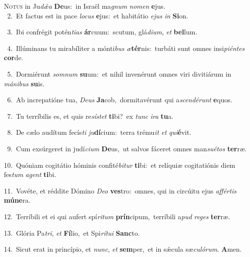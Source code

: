 \lettrine{\initial\textcolor{\initialcolor}{N}}{otus} in Ju\-\textit{dǽ}\-\textit{a} \textbf{De}\-us:~\star in Israël ma\textit{gnum} \textit{no}\-\textit{men} \textbf{e}\-jus.\\
{\numbfont\textcolor{\numbcolor}{~2.}}~Et factus est in pace \textit{lo}\-\textit{cus} \textbf{e}\-jus:~\star et habitátio \textit{e}\-\textit{jus} \textit{in} \textbf{Si}\-on.\par
{\numbfont\textcolor{\numbcolor}{~3.}}~Ibi confrégit potén\-\textit{ti}\-\textit{as} \textbf{ár}\-cuum:~\star scutum, glá\-\textit{di}\-\textit{um}, \textit{et} \textbf{bel}\-lum.\par
{\numbfont\textcolor{\numbcolor}{~4.}}~Illúminans tu mirabíliter a mónti\textit{bus} \textit{æ}\-\textbf{tér}nis:~\star turbáti sunt omnes insi\-\textit{pi}\-\textit{én}\textit{tes} \textbf{cor}\-de.\par
{\numbfont\textcolor{\numbcolor}{~5.}}~Dormiérunt \textit{som}\-\textit{num} \textbf{su}\-um:~\star et nihil invenérunt omnes viri divitiárum in \textit{má}\-\textit{ni}\textit{bus} \textbf{su}\-is.\par
{\numbfont\textcolor{\numbcolor}{~6.}}~Ab increpatióne tua, \textit{De}\-\textit{us} \textbf{Ja}\-cob,~\star dormitavérunt qui a\-\textit{scen}\-\textit{dé}\textit{runt} \textbf{e}\-quos.\par
{\numbfont\textcolor{\numbcolor}{~7.}}~Tu terríbilis es, et quis re\-\textit{sís}\-\textit{tet} \textbf{ti}\-bi?~\star ex \textit{tunc} \textit{i}\-\textit{ra} \textbf{tu}\-a.\par
{\numbfont\textcolor{\numbcolor}{~8.}}~De cælo audítum fecís\textit{ti} \textit{ju}\-\textbf{dí}cium:~\star terra trému\textit{it} \textit{et} \textit{qui}\-\textbf{é}vit.\par
{\numbfont\textcolor{\numbcolor}{~9.}}~Cum exsúrgeret in judí\-\textit{ci}\-\textit{um} \textbf{De}\-us,~\star ut salvos fáceret omnes man\-\textit{su}\-\textit{é}\textit{tos} \textbf{ter}\-ræ.\par
{\numbfont\textcolor{\numbcolor}{10.}}~Quóniam cogitátio hóminis confité\-\textit{bi}\-\textit{tur} \textbf{ti}\-bi:~\star et relíquiæ cogitatiónis diem fes\textit{tum} \textit{a}\-\textit{gent} \textbf{ti}\-bi.\par
{\numbfont\textcolor{\numbcolor}{11.}}~Vovéte, et réddite Dómino \textit{De}\-\textit{o} \textbf{ves}\-tro:~\star omnes, qui in circúitu ejus \textit{af}\-\textit{fér}\textit{tis} \textbf{mú}\-\textbf{ne}ra.\par
{\numbfont\textcolor{\numbcolor}{12.}}~Terríbili et ei qui aufert spí\-\textit{ri}\-\textit{tum} \textbf{prín}\-cipum,~\star terríbili a\textit{pud} \textit{re}\-\textit{ges} \textbf{ter}\-ræ.\par
{\numbfont\textcolor{\numbcolor}{13.}}~Glória Pa\-\textit{tri}\-, \textit{et} \textbf{Fí}\-lio,~\star et Spi\-\textit{rí}\-\textit{tu}\textit{i} \textbf{Sanc}\-to.\par
{\numbfont\textcolor{\numbcolor}{14.}}~Sicut erat in princípio, et \textit{nunc}\-, \textit{et} \textbf{sem}\-per,~\star et in sǽcula sæ\-\textit{cu}\-\textit{ló}\textit{rum}. \textbf{A}\-men.\par
